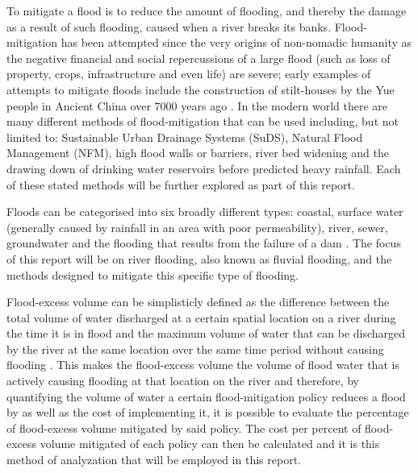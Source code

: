 \documentclass[11pt,a4paper]{article}
\begin{document}
To mitigate a flood is to reduce the amount of flooding, and thereby the damage as a result of such flooding, caused when a river breaks its banks. Flood-mitigation has been attempted since the very origins of non-nomadic humanity as the negative financial and social repercussions of a large flood (such as loss of property, crops, infrastructure and even life) are severe{;} early examples of attempts to mitigate floods include the construction of stilt-houses by the Yue people in Ancient China over 7000 years ago \cite{yue}. In the modern world there are many different methods of flood-mitigation that can be used including, but not limited to: Sustainable Urban Drainage Systems (SuDS), Natural Flood Management (NFM), high flood walls or barriers, river bed widening and the drawing down of drinking water reservoirs before predicted heavy rainfall. Each of these stated methods will be further explored as part of this report.

Floods can be categorised into six broadly different types: coastal, surface water (generally caused by rainfall in an area with poor permeability), river, sewer, groundwater and the flooding that results from the failure of a dam \cite{floodsource}. The focus of this report will be on river flooding, also known as fluvial flooding, and the methods designed to mitigate this specific type of flooding.

Flood-excess volume can be simplisticly defined as the difference between the total volume of water discharged at a certain spatial location on a river during the time it is in flood and the maximum volume of water that can be discharged by the river at the same location over the same time period without causing flooding \cite{Aire}. This makes the flood-excess volume the volume of flood water that is actively causing flooding at that location on the river and therefore, by quantifying the volume of water a certain flood-mitigation policy reduces a flood by as well as the cost of implementing it, it is possible to evaluate the percentage of flood-excess volume mitigated by said policy. The cost per percent of flood-excess volume mitigated of each policy can then be calculated and it is this method of analyzation that will be employed in this report.
\end{document}
